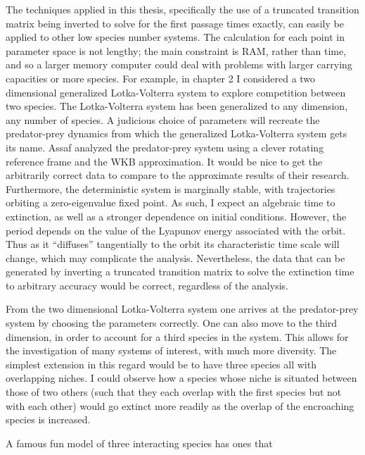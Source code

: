 The techniques applied in this thesis, specifically the use of a truncated transition matrix being inverted to solve for the first passage times exactly, can easily be applied to other low species number systems. 
The calculation for each point in parameter space is not lengthy; the main constraint is RAM, rather than time, and so a larger memory computer could deal with problems with larger carrying capacities or more species. %
For example, in chapter 2 I considered a two dimensional generalized Lotka-Volterra system to explore competition between two species. 
The Lotka-Volterra system has been generalized to any dimension, any number of species. 
A judicious choice of parameters will recreate the predator-prey dynamics from which the generalized Lotka-Volterra system gets its name. 
Assaf \cite{} analyzed the predator-prey system using a clever rotating reference frame and the WKB approximation. 
It would be nice to get the arbitrarily correct data to compare to the approximate results of their research. 
Furthermore, the deterministic system is marginally stable, with trajectories orbiting a zero-eigenvalue fixed point. As such, I expect an algebraic time to extinction, as well as a stronger dependence on initial conditions. 
However, the period depends on the value of the Lyapunov energy associated with the orbit. Thus as it ``diffuses'' tangentially to the orbit its characteristic time scale will change, which may complicate the analysis. 
Nevertheless, the data that can be generated by inverting a truncated transition matrix to solve the extinction time to arbitrary accuracy would be correct, regardless of the analysis. 

From the two dimensional Lotka-Volterra system one arrives at the predator-prey system by choosing the parameters correctly. 
One can also move to the third dimension, in order to account for a third species in the system. 
This allows for the investigation of many systems of interest, with much more diversity. 
The simplest extension in this regard would be to have three species all with overlapping niches. 
I could observe how a species whose niche is situated between those of two others (such that they each overlap with the first species but not with each other) would go extinct more readily as the overlap of the encroaching species is increased. 

A famous fun model of three interacting species has ones that %

